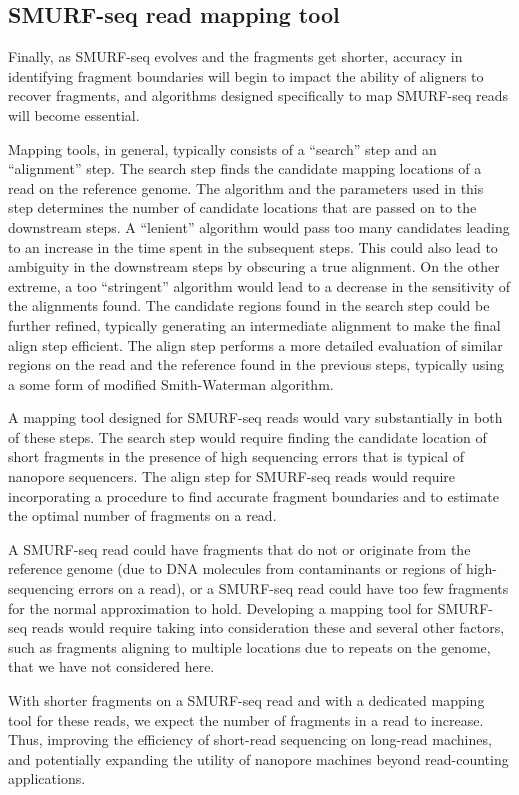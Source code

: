 \subsection*{SMURF-seq read mapping tool}
Finally, as SMURF-seq evolves and the fragments get shorter, accuracy in
identifying fragment boundaries will begin to impact the ability of
aligners to recover fragments, and algorithms designed specifically to
map SMURF-seq reads will become essential.

Mapping tools, in general, typically consists of a ``search'' step and
an ``alignment'' step.
The search step finds the candidate mapping locations of a read on the
reference genome. The algorithm and the parameters used in this step
determines the number of candidate locations that are passed on to the
downstream steps. A ``lenient'' algorithm would pass too many candidates
leading to an increase in the time spent in the subsequent steps. This
could also lead to ambiguity in the downstream steps by obscuring a true
alignment. On the other extreme, a too ``stringent'' algorithm would
lead to a decrease in the sensitivity of the alignments found.
The candidate regions found in the search step could be further refined,
typically generating an intermediate alignment to make the final align
step efficient.
The align step performs a more detailed evaluation of similar regions on
the read and the reference found in the previous steps, typically using
a some form of modified Smith-Waterman algorithm.

A mapping tool designed for SMURF-seq reads would vary substantially in
both of these steps. The search step would require finding the candidate
location of short fragments in the presence of high sequencing errors
that is typical of nanopore sequencers.
The align step for SMURF-seq reads would require incorporating a
procedure to find accurate fragment boundaries and to estimate the
optimal number of fragments on a read.

A SMURF-seq read could have fragments that do not or originate from the
reference genome (due to DNA molecules from contaminants or regions of
high-sequencing errors on a read),
or a SMURF-seq read could have too few fragments for the normal
approximation to hold.
%
Developing a mapping tool for SMURF-seq reads would require taking into
consideration these and several other factors, such as fragments
aligning to multiple locations due to repeats on the genome, that we
have not considered here.

With shorter fragments on a SMURF-seq read and with a dedicated mapping
tool for these reads, we expect the number of fragments in a read to
increase. Thus, improving the efficiency of short-read sequencing on
long-read machines, and potentially expanding the utility of nanopore
machines beyond read-counting applications.

